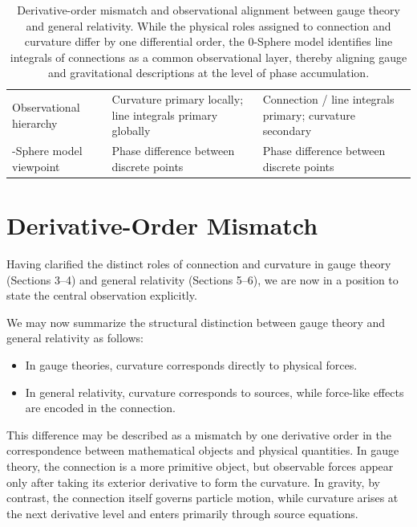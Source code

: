 \documentclass[12pt,letterpaper]{article}
\begin{document}
\begin{table}[t!]
\begin{tabular}{p{5.0cm}p{5.0cm}p{4.8cm}}
\addlinespace[0.25cm]
Observational hierarchy
& Curvature primary locally; line integrals primary globally
& Connection / line integrals primary; curvature secondary \\

\addlinespace[0.25cm]
0-Sphere model viewpoint
& Phase difference between discrete points
& Phase difference between discrete points \\
\bottomrule
\end{tabular}

\caption{Derivative-order mismatch and observational alignment between gauge theory and general relativity. 
While the physical roles assigned to connection and curvature differ by one differential order, 
the 0-Sphere model identifies line integrals of connections as a common observational layer, 
thereby aligning gauge and gravitational descriptions at the level of phase accumulation.}
\label{tab:derivative-order-summary}

\end{table}



\section{Derivative-Order Mismatch}

\justifying
Having clarified the distinct roles of connection and curvature in gauge theory (Sections 3--4) and general relativity (Sections 5--6), we are now in a position to state the central observation explicitly.

We may now summarize the structural distinction between gauge theory and general relativity as follows:
\begin{itemize}
\item In gauge theories, curvature corresponds directly to physical forces.
\item In general relativity, curvature corresponds to sources, while force-like effects are encoded in the connection.
\end{itemize}

This difference may be described as a mismatch by one derivative order in the correspondence between mathematical objects and physical quantities. In gauge theory, the connection is a more primitive object, but observable forces appear only after taking its exterior derivative to form the curvature. In gravity, by contrast, the connection itself governs particle motion, while curvature arises at the next derivative level and enters primarily through source equations.
\end{document}
